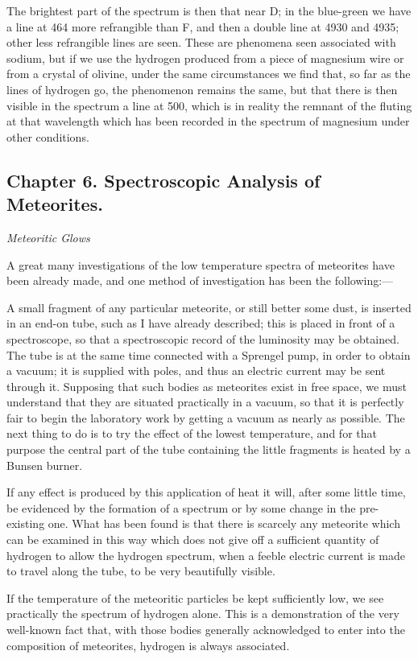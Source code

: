 \documentclass[a4paper, 12pt, oneside, polutonikogreek, english]{article}
\begin{document}
The brightest part of the spectrum is then that near D; in the blue-green we have a line at 464 more refrangible than F, and then a double line at 4930 and 4935; other less refrangible lines are seen. These are phenomena seen associated with sodium, but if we use the hydrogen produced from a piece of magnesium wire or from a crystal of olivine, under the same circumstances we find that, so far as the lines of hydrogen go, the phenomenon remains the same, but that there is then visible in the spectrum a line at 500, which is in reality the remnant of the fluting at that wavelength which has been recorded in the spectrum of magnesium under other conditions.

\subsection{Chapter 6. Spectroscopic Analysis of Meteorites.}

\emph{Meteoritic Glows}

A great many investigations of the low temperature spectra of meteorites have been already made, and one method of investigation has been the following:---

A small fragment of any particular meteorite, or still better some dust, is inserted in an end-on tube, such as I have already described; this is placed in front of a spectroscope, so that a spectroscopic record of the luminosity may be obtained. The tube is at the same time connected with a Sprengel pump, in order to obtain a vacuum; it is supplied with poles, and thus an electric current may be sent through it. Supposing that such bodies as meteorites exist in free space, we must understand that they are situated practically in a vacuum, so that it is perfectly fair to begin the laboratory work by getting a vacuum as nearly as possible. The next thing to do is to try the effect of the lowest temperature, and for that purpose the central part of the tube containing the little fragments is heated by a Bunsen burner.

If any effect is produced by this application of heat it will, after some little time, be evidenced by the formation of a spectrum or by some change in the pre-existing one. What has been found is that there is scarcely any meteorite which can be examined in this way which does not give off a sufficient quantity of hydrogen to allow the hydrogen spectrum, when a feeble electric current is made to travel along the tube, to be very beautifully visible.

If the temperature of the meteoritic particles be kept sufficiently low, we see practically the spectrum of hydrogen alone. This is a demonstration of the very well-known fact that, with those bodies generally acknowledged to enter into the composition of meteorites, hydrogen is always associated.
\end{document}

